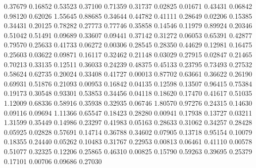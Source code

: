   0.37679 0.16852
  0.53523 0.37100
  0.71359 0.31737
  0.02825 0.01671
  0.43431 0.06842
  0.98120 0.62026
  1.55645 0.88685
  0.34644 0.44782
  0.41111 0.28649
  0.02206 0.15385
  0.34431 0.20125
  0.78282 0.27773
  0.77746 0.35858
  0.14546 0.11979
  0.89924 0.20346
  0.51042 0.51491
  0.09689 0.33607
  0.09441 0.37142
  0.31272 0.06053
  0.65391 0.42877
  0.79570 0.25633
  0.41733 0.06272
  0.00306 0.28545
  0.28350 0.44629
  0.12981 0.16475
  0.25603 0.03622
  0.09871 0.16117
  0.32462 0.21148
  0.03029 0.27915
  0.02847 0.21465
  0.70213 0.33135
  0.12511 0.36033
  0.24239 0.48375
  0.45133 0.23795
  0.73493 0.27532
  0.58624 0.62735
  0.20024 0.33408
  0.41727 0.00013
  0.87702 0.63661
  0.36622 0.26190
  0.69931 0.51876
  0.21093 0.00953
  0.16842 0.04135
  0.12598 0.13507
  0.96415 0.75384
  0.19173 0.30548
  0.93301 0.53853
  0.34456 0.04118
  0.18620 0.17470
  0.41617 0.51035
  1.12009 0.68336
  0.58916 0.35938
  0.32935 0.06746
  1.80570 0.97276
  0.24315 0.14630
  0.09116 0.09694
  1.11366 0.65547
  0.18423 0.28280
  0.00941 0.17938
  0.13727 0.03211
  1.31599 0.35449
  0.14986 0.23297
  0.41983 0.05163
  0.28633 0.31062
  0.34257 0.28428
  0.05925 0.02828
  0.57691 0.14714
  0.36788 0.34602
  0.07905 0.13718
  0.95154 0.10079
  0.18355 0.24440
  0.05262 0.10483
  0.31767 0.22953
  0.00813 0.06461
  0.41110 0.00578
  0.51077 0.32325
  0.12206 0.25865
  0.46310 0.00825
  0.15790 0.59263
  0.39695 0.25379
  0.17101 0.00706
  0.09686 0.27030